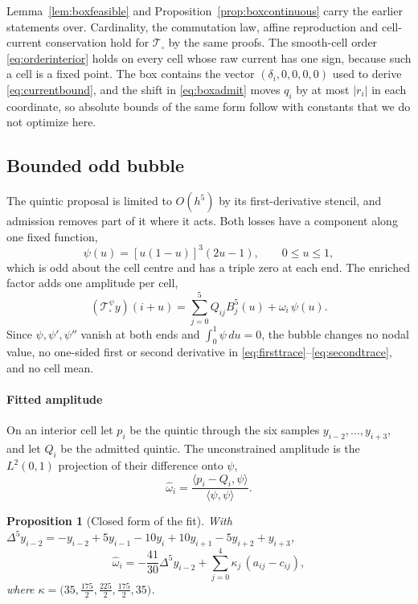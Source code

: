 \documentclass[journal]{IEEEtran}
\newtheorem{proposition}{Proposition}
\newcommand{\Tcal}{\mathcal{T}}
\begin{document}
Lemma~\ref{lem:boxfeasible} and Proposition~\ref{prop:boxcontinuous}
carry the earlier statements over. Cardinality, the commutation law,
affine reproduction and cell-current conservation hold for
\(\Tcal_\square\) by the same proofs. The smooth-cell order
\eqref{eq:orderinterior} holds on every cell whose raw current has one
sign, because such a cell is a fixed point. The box contains the vector
\((\delta_i,0,0,0,0)\) used to derive \eqref{eq:currentbound}, and the
shift in \eqref{eq:boxadmit} moves \(q_i\) by at most \(|r_i|\) in each
coordinate, so absolute bounds of the same form follow with constants
that we do not optimize here.

\subsection{Bounded odd bubble}

The quintic proposal is limited to \(O(h^5)\) by its first-derivative
stencil, and admission removes part of it where it acts. Both losses
have a component along one fixed function,
\begin{equation}
 \psi(u)=[u(1-u)]^3(2u-1),\qquad0\le u\le1,
 \label{eq:bubble}
\end{equation}
which is odd about the cell centre and has a triple zero at each end.
The enriched factor adds one amplitude per cell,
\begin{equation}
 (\Tcal_\square^{\psi}y)(i+u)
 =\sum_{j=0}^{5}Q_{ij}B_j^5(u)+\omega_i\,\psi(u).
 \label{eq:bubblesynthesis}
\end{equation}
Since \(\psi,\psi',\psi''\) vanish at both ends and
\(\int_0^1\psi\,du=0\), the bubble changes no nodal value, no one-sided
first or second derivative in
\eqref{eq:firsttrace}--\eqref{eq:secondtrace}, and no cell mean.

\paragraph{Fitted amplitude}
On an interior cell let \(p_i\) be the quintic through the six samples
\(y_{i-2},\ldots,y_{i+3}\), and let \(Q_i\) be the admitted quintic. The
unconstrained amplitude is the \(L^2(0,1)\) projection of their
difference onto \(\psi\),
\begin{equation}
 \widehat\omega_i
 =\frac{\langle p_i-Q_i,\psi\rangle}{\langle\psi,\psi\rangle}.
 \label{eq:bubblefit}
\end{equation}

\begin{proposition}[Closed form of the fit]
\label{prop:bubblefit}
With \(\Delta^5y_{i-2}=-y_{i-2}+5y_{i-1}-10y_i+10y_{i+1}-5y_{i+2}+y_{i+3}\),
\begin{equation}
 \widehat\omega_i=-\frac{41}{30}\Delta^5y_{i-2}
 +\sum_{j=0}^{4}\kappa_j\,(a_{ij}-c_{ij}),
 \label{eq:bubbleclosed}
\end{equation}
where
\(\kappa=\bigl(35,\tfrac{175}{2},\tfrac{225}{2},\tfrac{175}{2},35\bigr)\).
\end{proposition}
\end{document}
